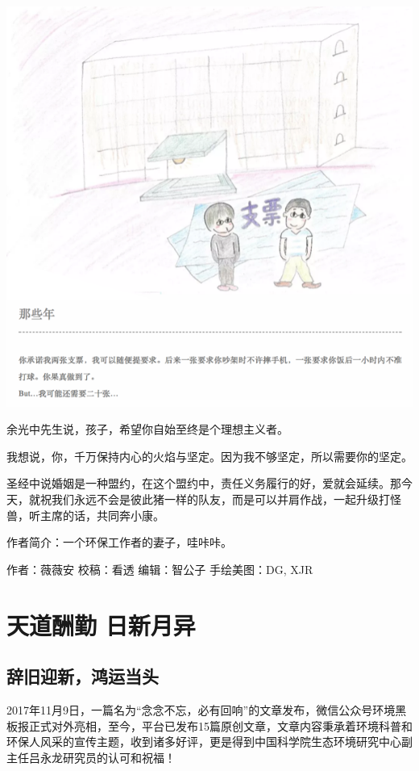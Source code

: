 \documentclass[]{book}
\begin{document}
\includegraphics[width=8.33in]{images/wife5}

余光中先生说，孩子，希望你自始至终是个理想主义者。

我想说，你，千万保持内心的火焰与坚定。因为我不够坚定，所以需要你的坚定。

圣经中说婚姻是一种盟约，在这个盟约中，责任义务履行的好，爱就会延续。那今天，就祝我们永远不会是彼此猪一样的队友，而是可以并肩作战，一起升级打怪兽，听主席的话，共同奔小康。

作者简介：一个环保工作者的妻子，哇咔咔。

作者：薇薇安 校稿：看透 编辑：智公子 手绘美图：DG, XJR

\section{天道酬勤 日新月异}\label{-}

\subsection{辞旧迎新，鸿运当头}

2017年11月9日，一篇名为``念念不忘，必有回响''的文章发布，微信公众号环境黑板报正式对外亮相，至今，平台已发布15篇原创文章，文章内容秉承着环境科普和环保人风采的宣传主题，收到诸多好评，更是得到中国科学院生态环境研究中心副主任吕永龙研究员的认可和祝福！
\end{document}

